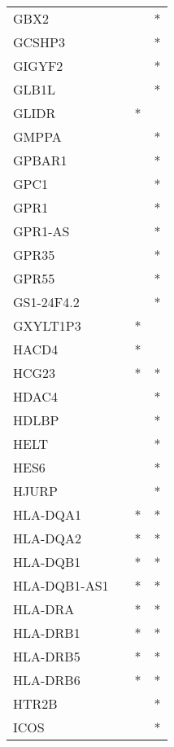 \begin{longtable}{lccc}
GBX2           &           &     &       * \\
GCSHP3         &           &     &       * \\
GIGYF2         &           &     &       * \\
GLB1L          &           &     &       * \\
GLIDR          &           &   * &         \\
GMPPA          &           &     &       * \\
GPBAR1         &           &     &       * \\
GPC1           &           &     &       * \\
GPR1           &           &     &       * \\
GPR1-AS        &           &     &       * \\
GPR35          &           &     &       * \\
GPR55          &           &     &       * \\
GS1-24F4.2     &           &     &       * \\
GXYLT1P3       &           &   * &         \\
HACD4          &           &   * &         \\
HCG23          &           &   * &       * \\
HDAC4          &           &     &       * \\
HDLBP          &           &     &       * \\
HELT           &           &     &       * \\
HES6           &           &     &       * \\
HJURP          &           &     &       * \\
HLA-DQA1       &           &   * &       * \\
HLA-DQA2       &           &   * &       * \\
HLA-DQB1       &           &   * &       * \\
HLA-DQB1-AS1   &           &   * &       * \\
HLA-DRA        &           &   * &       * \\
HLA-DRB1       &           &   * &       * \\
HLA-DRB5       &           &   * &       * \\
HLA-DRB6       &           &   * &       * \\
HTR2B          &           &     &       * \\
ICOS           &           &     &       * \\

\end{longtable}
